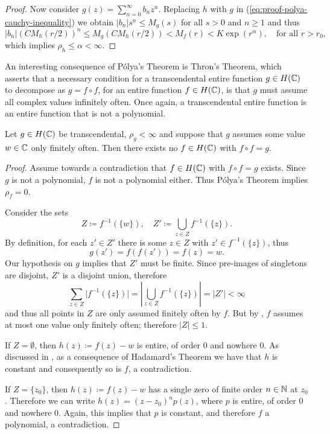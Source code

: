 \begin{proof}
    Now consider $g(z) = \sum_{n=0}^\infty b_n z^n$. Replacing $h$ with $g$ in (\ref{eq:proof-polya-cauchy-inequality}) we obtain $\vert b_n \vert s^n \leq M_g(s)$ for all $s > 0$ and $n \geq 1$ and thus
    \begin{equation*}
        \vert b_n \vert (C M_h(r/2))^n \leq M_g(C M_h(r/2)) < M_f(r) < K \exp(r^\alpha), \quad \textrm{for all } r > r_0,
    \end{equation*}
    which implies $\rho_h \leq \alpha < \infty$.
\end{proof}

An interesting consequence of Pólya's Theorem is Thron's Theorem, which asserts that a necessary condition for a transcendental entire function $g \in H(\mathbb{C})$ to decompose as $g = f \circ f$, for an entire function $f \in H(\mathbb{C})$, is that $g$ must assume all complex values infinitely often. Once again, a transcendental entire function is an entire function that is not a polynomial.

\begin{theorem}[Thron] \label{thm:thron}
    Let $g \in H(\mathbb{C})$ be transcendental, $\rho_g < \infty$ and suppose that $g$ assumes some value $w \in \mathbb{C}$ only finitely often. Then there exists no $f \in H(\mathbb{C})$ with $f \circ f = g$.
\end{theorem}

\begin{proof}
    Assume towards a contradiction that $f \in H(\mathbb{C})$ with $f \circ f = g$ exists. Since $g$ is not a polynomial, $f$ is not a polynomial either. Thus Pólya's Theorem implies $\rho_f = 0$.
    
    Consider the sets
    $$ Z \coloneqq f^{-1}(\{ w \}), \quad Z' \coloneqq \bigcup_{z \in Z} f^{-1}(\{ z \}). $$
    By definition, for each $z' \in Z'$ there is some $z \in Z$ with $z' \in f^{-1}(\{ z \})$, thus
    $$ g(z') = f(f(z')) = f(z) = w. $$
    Our hypothesis on $g$ implies that $Z'$ must be finite. Since pre-images of singletons are disjoint, $Z'$ is a disjoint union, therefore
    $$ \sum_{z \in Z} \vert f^{-1}(\{ z \}) \vert = \left\vert \bigcup_{z \in Z} f^{-1}(\{ z \}) \right\vert = \vert Z' \vert < \infty $$
    and thus all points in $Z$ are only assumed finitely often by $f$. But by , $f$ assumes at most one value only finitely often; therefore $\vert Z \vert \leq 1$.

    If $Z = \emptyset$, then $h(z) \coloneqq f(z) - w$ is entire, of order $0$ and nowhere $0$. As discussed in , as a consequence of Hadamard's Theorem we have that $h$ is constant and consequently so is $f$, a contradiction.

    If $Z = \{ z_0 \}$, then $h(z) \coloneqq f(z) - w$ has a single zero of finite order $n \in \mathbb{N}$ at $z_0$. Therefore we can write $h(z) = (z - z_0)^n p(z)$, where $p$ is entire, of order $0$ and nowhere $0$. Again, this implies that $p$ is constant, and therefore $f$ a polynomial, a contradiction.
\end{proof}

